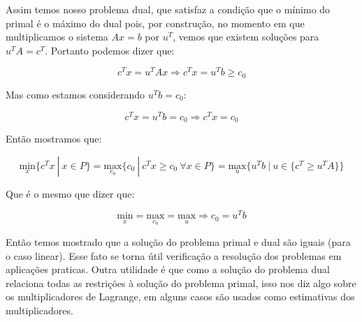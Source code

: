 Assim temos nosso problema dual, que satisfaz a condição que o mínimo do primal é o máximo do
dual pois, por construção, no momento em que multiplicamos o sistema \(Ax = b\) por \(u^T\),
vemos que existem soluções para \(u^TA = c^T\). Portanto podemos dizer que:

\begin{equation}
  c^Tx = u^TAx \Rightarrow c^Tx = u^Tb \geq c_0
\end{equation}

Mas como estamos considerando \(u^Tb = c_0\):

\begin{equation}
 c^Tx = u^Tb = c_0 \Rightarrow c^Tx = c_0
\end{equation}


Então mostramos que:

\begin{equation}
\underset{x}{\mathrm{min}}\{c^Tx\ |\ x \in P \}
=
\underset{c_0}{\mathrm{max}}\{c_0\ |\ c^Tx \geq c_0\ \forall x \in P\}
=
\underset{u}{\mathrm{max}}\{u^Tb\ |\ u \in \{c^T \geq u^TA \} \}
\end{equation}

Que é o mesmo que dizer que:

\begin{equation}
\underset{x}{\mathrm{min}} = \underset{c_0}{\mathrm{max}} = \underset{u}{\mathrm{max}} \Rightarrow c_0 = u^Tb
\end{equation}

Então temos mostrado que a solução do problema primal e dual são iguais (para o caso linear). Esse fato se
torna útil verificação a resolução dos problemas em aplicações praticas. Outra utilidade é que como a
solução do problema dual relaciona todas as restrições à solução do problema primal, isso nos diz algo
sobre os multiplicadores de Lagrange, em alguns casos são usados como estimativas dos multiplicadores.
